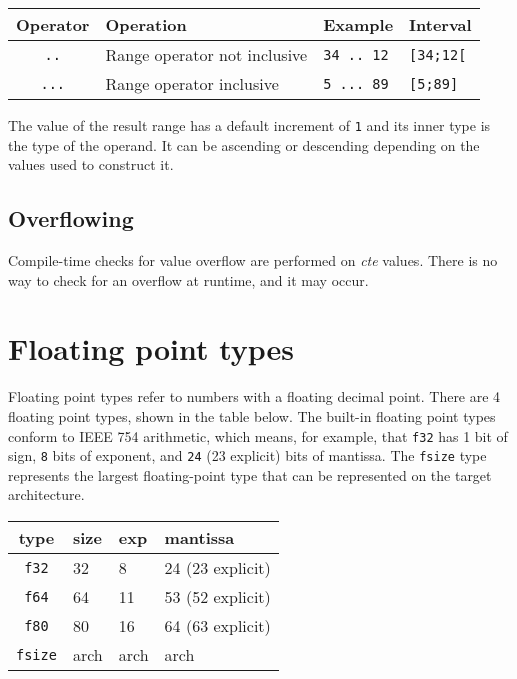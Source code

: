 \begin{itemize}
  \begin{center}
    \vspace{-10pt}
    \begin{adjustbox}{max width=1.0\linewidth}
      \begin{tabular}{|c|lll|}
        \hline
        Operator & Operation & Example & Interval\\[0pt]
        \hline
        \texttt{..} & Range operator not inclusive & \texttt{34 .. 12} & \texttt{[34;12[}\\[0pt]
            \texttt{...} & Range operator inclusive & \texttt{5 ... 89} & \texttt{[5;89]}\\[0pt]
            \hline
      \end{tabular}
    \end{adjustbox}
  \end{center}

The value of the result range has a default increment of \texttt{1} and its
inner type is the type of the operand. It can be ascending or descending
depending on the values used to construct it.

\end{itemize}

\subsection{Overflowing}
\label{sec:org0881da2}

Compile-time checks for value overflow are performed on \textit{cte} values.
There is no way to check for an overflow at runtime, and it may occur.



\section{Floating point types}
\label{sec:orgae6ed5f}

Floating point types refer to numbers with a floating decimal point. There are 4
floating point types, shown in the table below. The built-in floating point
types conform to IEEE 754 arithmetic, which means, for example, that
\texttt{f32} has 1 bit of sign, \texttt{8} bits of exponent, and \texttt{24} (23
explicit) bits of mantissa. The \texttt{fsize} type represents the largest
floating-point type that can be represented on the target architecture.

\begin{center}
  \vspace{-5pt}
  \begin{tabular}{|c|lll|}
    \hline
    type & size & exp & mantissa\\[0pt]
    \hline
    \hline
    \texttt{f32} & 32 & 8 & 24 (23 explicit)\\[0pt]
    \texttt{f64} & 64 & 11 & 53 (52 explicit)\\[0pt]
    \texttt{f80} & 80 & 16 & 64 (63 explicit)\\[0pt]
    \texttt{fsize} & arch & arch & arch\\[0pt]
    \hline
  \end{tabular}
\end{center}


